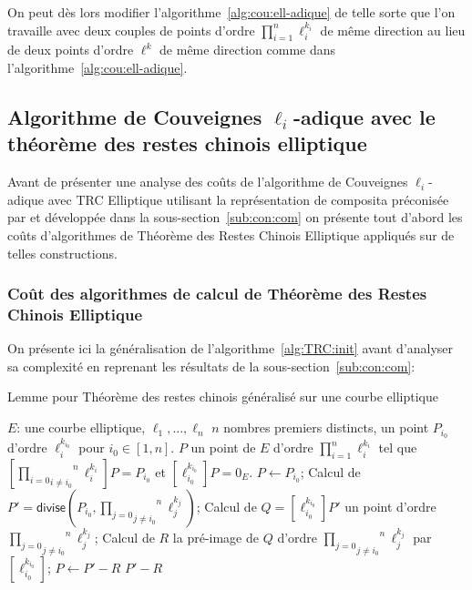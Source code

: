 \documentclass[10pt,a4paper]{book}
\theoremstyle{plain}
\theoremstyle{definition}
\theoremstyle{definition}
\theoremstyle{definition}
\theoremstyle{definition}
\theoremstyle{remark}
\theoremstyle{remark}
\theoremstyle{definition}
\begin{document}
 On peut dès lors modifier l'algorithme~\ref{alg:cou:ell-adique} de telle sorte
 que l'on travaille avec deux couples de points d'ordre 
 $\prod_{i=1}^n\ell_i^{k_i}$ de même direction au lieu de deux points d'ordre
 $\ell^k$ de même direction comme dans l'algorithme~\ref{alg:cou:ell-adique}.



 
\subsection{Algorithme de Couveignes $\ell_i$-adique avec le théorème des restes chinois elliptique}

Avant de présenter une analyse des coûts de l'algorithme de Couveignes 
$\ell_i$-adique avec TRC Elliptique utilisant la représentation de composita 
préconisée par \cite{DeFeoDoliskaniSchost14} et développée dans la 
sous-section~\ref{sub:con:com} on présente tout d'abord les coûts d'algorithmes
de Théorème des Restes Chinois Elliptique appliqués sur de telles constructions.

\subsubsection{Coût des algorithmes de calcul de Théorème des Restes Chinois Elliptique}

On présente ici la généralisation de l'algorithme~\ref{alg:TRC:init} avant 
d'analyser sa complexité en reprenant les résultats de la 
sous-section~\ref{sub:con:com}: 


\begin{algorithm}
\caption{\label{alg:TRC:init:gen}Lemme pour Théorème des restes chinois généralisé sur une courbe elliptique }
\begin{algorithmic}[1]
\REQUIRE $E$: une courbe elliptique, $\ell_1, \dots, \ell_n$ $n$ nombres premiers distincts, un point $P_{i_0}$ d'ordre $\ell_i^{k_{i_0}}$ pour $i_0 \in [1,n]$.
\ENSURE $P$ un point de $E$ d'ordre $\prod_{i=1}^n \ell_i^{k_i}$  tel que $[\overset{n}{\underset{i \neq i_0}{\underset{i = 0}{\prod}}}\ell_i^{k_i} ]P=P_{i_0}$ et $[\ell_{i_0}^{k_{i_0}}]P=0_E$.
\STATE $P \leftarrow P_{i_0}$;
\STATE \label{alg:TRC:init:gen:div} Calcul de $P'=\mathsf{divise}(P_{i_0},\overset{n}{\underset{j \neq i_0}{\underset{j = 0}{\prod}}}\ell_j^{k_j})$;
\STATE \label{alg:TRC:init:gen:mul} Calcul de $Q=[\ell_{i_0}^{k_{i_0}}]P'$ un point d'ordre $\overset{n}{\underset{j \neq i_0}{\underset{j = 0}{\prod}}}\ell_j^{k_j}$;
\STATE \label{alg:TRC:init:gen:prim} Calcul de $R$ la pré-image de $Q$ d'ordre $\overset{n}{\underset{j \neq i_0}{\underset{j = 0}{\prod}}}\ell_j^{k_j}$ par $[\ell_{i_0}^{k_{i_0}}]$;
\STATE $P \leftarrow P'-R$
\RETURN $P'-R$
\end{algorithmic}
\end{algorithm}
\end{document}
